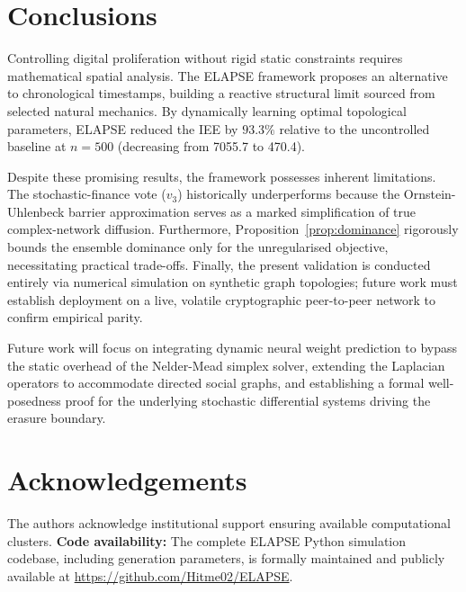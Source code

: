 \documentclass[review,12pt]{elsarticle}
\begin{document}
\section{Conclusions}

Controlling digital proliferation without rigid static constraints requires mathematical spatial analysis. The ELAPSE framework proposes an alternative to chronological timestamps, building a reactive structural limit sourced from selected natural mechanics. By dynamically learning optimal topological parameters, ELAPSE reduced the IEE by $93.3\%$ relative to the uncontrolled baseline at $n=500$ (decreasing from 7055.7 to 470.4).

Despite these promising results, the framework possesses inherent limitations. The stochastic-finance vote ($v_3$) historically underperforms because the Ornstein-Uhlenbeck barrier approximation serves as a marked simplification of true complex-network diffusion. Furthermore, Proposition~\ref{prop:dominance} rigorously bounds the ensemble dominance only for the unregularised objective, necessitating practical trade-offs. Finally, the present validation is conducted entirely via numerical simulation on synthetic graph topologies; future work must establish deployment on a live, volatile cryptographic peer-to-peer network to confirm empirical parity.

Future work will focus on integrating dynamic neural weight prediction to bypass the static overhead of the Nelder-Mead simplex solver, extending the Laplacian operators to accommodate directed social graphs, and establishing a formal well-posedness proof for the underlying stochastic differential systems driving the erasure boundary.

\section*{Acknowledgements}
The authors acknowledge institutional support ensuring available computational clusters. \textbf{Code availability:} The complete ELAPSE Python simulation codebase, including generation parameters, is formally maintained and publicly available at \mbox{\url{https://github.com/Hitme02/ELAPSE}}.
\end{document}
